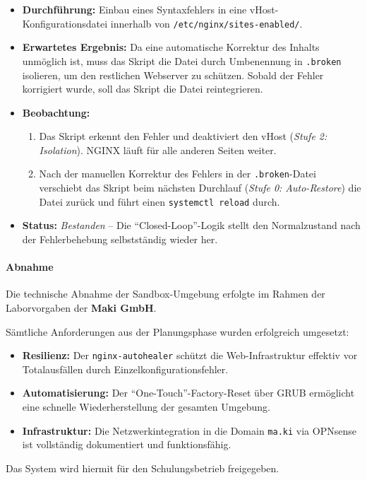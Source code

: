 \documentclass[11pt,
a4paper,
numbers=nonperiod,
footsepline,
oneside,
numbers=noenddot,
bibliography=totoc
]{scrartcl}
\begin{document}
\begin{itemize}
	\item \textbf{Durchführung:} Einbau eines Syntaxfehlers in eine vHost-Konfigurationsdatei innerhalb von \texttt{/etc/nginx/sites-enabled/}.
	\item \textbf{Erwartetes Ergebnis:} Da eine automatische Korrektur des Inhalts unmöglich ist, muss das Skript die Datei durch Umbenennung in \texttt{.broken} isolieren, um den restlichen Webserver zu schützen. Sobald der Fehler korrigiert wurde, soll das Skript die Datei reintegrieren.
	\item \textbf{Beobachtung:} 
	\begin{enumerate}
		\item Das Skript erkennt den Fehler und deaktiviert den vHost (\textit{Stufe 2: Isolation}). NGINX läuft für alle anderen Seiten weiter.
		\item Nach der manuellen Korrektur des Fehlers in der \texttt{.broken}-Datei verschiebt das Skript beim nächsten Durchlauf (\textit{Stufe 0: Auto-Restore}) die Datei zurück und führt einen \texttt{systemctl reload} durch.
	\end{enumerate}
	\item \textbf{Status:} \textit{Bestanden} – Die "`Closed-Loop"'-Logik stellt den Normalzustand nach der Fehlerbehebung selbstständig wieder her.
\end{itemize}

\paragraph{Abnahme}
Die technische Abnahme der Sandbox-Umgebung erfolgte im Rahmen der Laborvorgaben der \textbf{Maki GmbH}. 

Sämtliche Anforderungen aus der Planungsphase wurden erfolgreich umgesetzt:
\begin{itemize}
	\item \textbf{Resilienz:} Der \texttt{nginx-autohealer} schützt die Web-Infrastruktur effektiv vor Totalausfällen durch Einzelkonfigurationsfehler.
	\item \textbf{Automatisierung:} Der "`One-Touch"'-Factory-Reset über GRUB ermöglicht eine schnelle Wiederherstellung der gesamten Umgebung.
	\item \textbf{Infrastruktur:} Die Netzwerkintegration in die Domain \texttt{ma.ki} via OPNsense ist vollständig dokumentiert und funktionsfähig.
\end{itemize}

Das System wird hiermit für den Schulungsbetrieb freigegeben.
\end{document}
